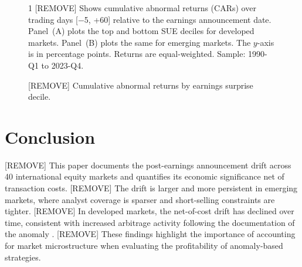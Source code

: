 \documentclass[12pt]{article}
\begin{document}
\begin{figure}[h!]
\begin{center}
\fbox{\rule{0pt}{4cm}\rule{0.95\textwidth}{0pt}}
\end{center}
\vspace{-4mm}
\caption{[REMOVE] Cumulative abnormal returns by earnings surprise decile.}
\vspace{-2mm}
\begin{justify}
\begin{spacing}{1}
\footnotesize{
[REMOVE] Shows cumulative abnormal returns (CARs) over trading days [$-$5, +60] relative to the earnings announcement date. Panel~(A) plots the top and bottom SUE deciles for developed markets. Panel~(B) plots the same for emerging markets. The $y$-axis is in percentage points. Returns are equal-weighted. Sample: 1990-Q1 to 2023-Q4.
}
\end{spacing}
\end{justify}
\vspace{-12mm}
\label{fig:example}
\end{figure}




\section{Conclusion}\label{sec:conclusion}

[REMOVE] This paper documents the post-earnings announcement drift across 40 international equity markets and quantifies its economic significance net of transaction costs. [REMOVE] The drift is larger and more persistent in emerging markets, where analyst coverage is sparser and short-selling constraints are tighter. [REMOVE] In developed markets, the net-of-cost drift has declined over time, consistent with increased arbitrage activity following the documentation of the anomaly \citep{FamaFrench_2015}. [REMOVE] These findings highlight the importance of accounting for market microstructure when evaluating the profitability of anomaly-based strategies.

\end{document}
